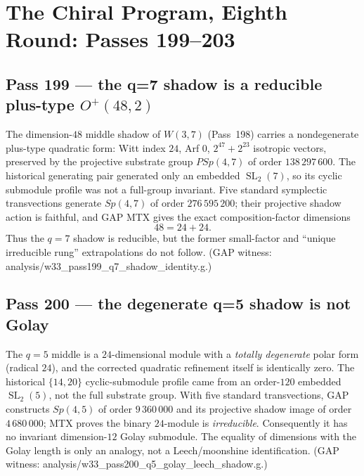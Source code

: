 \documentclass[12pt,a4paper]{article}
\def\mathrm#1{#1}%
\def\texttt#1{#1}%
\theoremstyle{definition}
\newcommand{\Sp}{\mathrm{Sp}}
\newcommand{\PSp}{\mathrm{PSp}}
\begin{document}
\section{The Chiral Program, Eighth Round: Passes 199--203}
\label{sec:chiral-program-eight}

\subsection{Pass 199 --- the q=7 shadow is a reducible plus-type
$O^+(48,2)$}
\label{ssec:pass199}

The dimension-$48$ middle shadow of $W(3,7)$ (Pass~198) carries a
nondegenerate plus-type quadratic form: Witt index $24$, Arf $0$,
$2^{47}+2^{23}$ isotropic vectors, preserved by the projective substrate
group $\PSp(4,7)$ of order $138\,297\,600$.  The historical generating
pair generated only an embedded $\operatorname{SL}_2(7)$, so its cyclic
submodule profile was not a full-group invariant.  Five standard
symplectic transvections generate $\Sp(4,7)$ of order $276\,595\,200$;
their projective shadow action is faithful, and GAP MTX gives the exact
composition-factor dimensions
\[
  \boxed{48=24+24.}
\]
Thus the $q=7$ shadow is reducible, but the former small-factor and
``unique irreducible rung'' extrapolations do not follow. (GAP witness:
\texttt{analysis/w33\_pass199\_q7\_shadow\_identity.g}.)

\subsection{Pass 200 --- the degenerate q=5 shadow is not Golay}
\label{ssec:pass200}

The $q=5$ middle is a $24$-dimensional module with a \emph{totally
degenerate} polar form (radical $24$), and the corrected quadratic
refinement itself is identically zero.  The historical $\{14,20\}$
cyclic-submodule profile came from an order-$120$ embedded
$\operatorname{SL}_2(5)$, not the full substrate group.  With five standard
transvections, GAP constructs $\Sp(4,5)$ of order $9\,360\,000$ and its
projective shadow image of order $4\,680\,000$; MTX proves the binary
$24$-module is \emph{irreducible}.  Consequently it has no invariant
dimension-$12$ Golay submodule.  The equality of dimensions with the Golay
length is only an analogy, not a Leech/moonshine identification. (GAP
witness: \texttt{analysis/w33\_pass200\_q5\_golay\_leech\_shadow.g}.)
\end{document}

